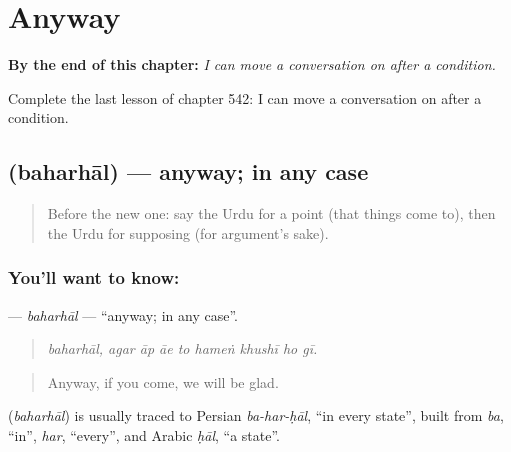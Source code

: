 
\chapter{Anyway}
\label{ch:ur-anyway}

\begin{chapteropening}
\textbf{By the end of this chapter:} \emph{I can move a conversation on after a condition.}

Complete the last lesson of chapter 542: I can move a conversation on after a condition.
\end{chapteropening}

\section[\texorpdfstring{\ur{بہرحال} (baharhāl)}{بہرحال (baharhāl)}]{ (baharhāl) — anyway; in any case}

\label{lesson:UR-C542-baharhal}



\begin{quote}
Before the new one: say the Urdu for a point (that things come to), then the Urdu for supposing (for argument's sake).
\end{quote}

\subsection*{You'll want to know: }
\textbf{} — \emph{baharhāl} — \textquotedblleft{}anyway; in any case\textquotedblright{}.

\begin{quote}
        
\end{quote}

\begin{quote}
\emph{baharhāl, agar āp āe to hameṅ khushī ho gī.}
\end{quote}

\begin{quote}
Anyway, if you come, we will be glad.
\end{quote}

\begin{cousinweb}
\textbf{} (\emph{baharhāl}) is usually traced to Persian \emph{ba-har-ḥāl}, \textquotedblleft{}in every state\textquotedblright{}, built from \emph{ba}, \textquotedblleft{}in\textquotedblright{}, \emph{har}, \textquotedblleft{}every\textquotedblright{}, and Arabic \emph{ḥāl}, \textquotedblleft{}a state\textquotedblright{}.
\end{cousinweb}

